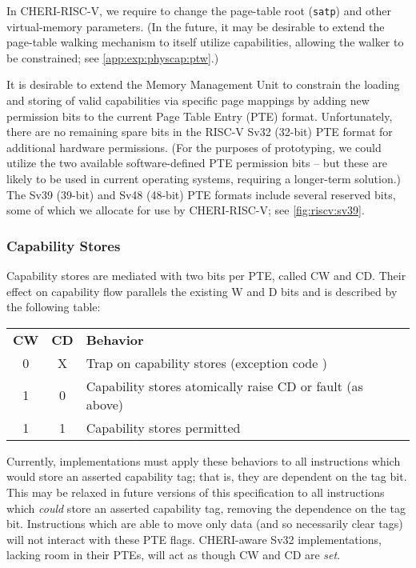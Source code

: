 In CHERI-RISC-V, we require \cappermASR{} to change
the page-table root (\texttt{satp}) and other virtual-memory parameters.
(In the future, it may be desirable to extend the page-table walking mechanism
to itself utilize capabilities, allowing the walker to be constrained;
see \cref{app:exp:physcap:ptw}.)

It is desirable to extend the Memory Management Unit
to constrain the loading and storing of valid capabilities via specific page
mappings by adding new permission bits to the current Page Table Entry
(PTE) format.
%
Unfortunately, there are no remaining spare bits in the RISC-V Sv32 (32-bit)
PTE format for additional hardware permissions.
(For the purposes of prototyping, we could utilize the two
available software-defined PTE permission bits -- but these are likely to be
used in current operating systems, requiring a longer-term solution.)
%
The Sv39 (39-bit) and Sv48 (48-bit) PTE formats include several reserved bits,
some of which we allocate for use by CHERI-RISC-V; see \cref{fig:riscv:sv39}.

\subsubsection{Capability Stores}

Capability stores are mediated with two bits per PTE, called CW and CD.  Their
effect on capability flow parallels the existing W and D bits and is described
by the following table:

\begin{center}
%
\begin{tabular}{ccl}

\textbf{CW} & \textbf{CD} & \textbf{Behavior} \\
0 & X & Trap on capability stores (exception code \riscvstorecappagefault{}) \\
1 & 0 & Capability stores atomically raise CD or fault (as above) \\
1 & 1 & Capability stores permitted
\end{tabular}
%
\end{center}

\noindent Currently, implementations must apply these behaviors to all
instructions which would store an asserted capability tag; that is, they are
dependent on the tag bit. This may be relaxed in future versions of this
specification to all instructions which \emph{could} store an asserted
capability tag, removing the dependence on the tag bit. Instructions which are
able to move only data (and so necessarily clear tags) will not interact with
these PTE flags. CHERI-aware Sv32 implementations, lacking room in their PTEs,
will act as though CW and CD are \emph{set}.

